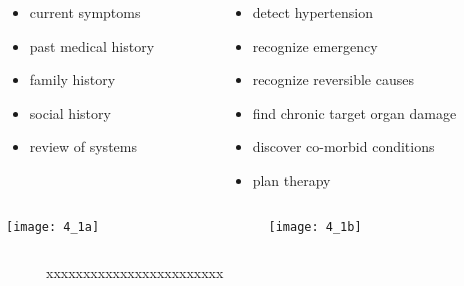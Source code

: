 	
\begin{columns}
  \begin{column}{0.5\textwidth}
    \begin{itemize}
        \item current symptoms
        \item past medical history
        \item family history
        \item social history
        \item review of systems
    \end{itemize}
  \end{column}

  \begin{column}{0.5\textwidth}
     \begin{itemize}
        \item detect hypertension
        \item recognize emergency
        \item recognize reversible causes
        \item find chronic target organ damage
        \item discover co-morbid conditions
        \item plan therapy
     \end{itemize}
  \end{column}
\end{columns}


  \begin{columns}
	\begin{column}{0.5\textwidth}
	  \centering	
  	  \texttt{[image: 4\_1a]}
     \end{column}
  	\begin{column}{0.5\textwidth}
  		\centering	
	    \texttt{[image: 4\_1b]}
       \end{column}
    \end{columns}
 \begin{figure}[h!]
  \centering
    \caption{
    	{\small \NUMfigures 
    	xxxxxxxxxxxxxxxxxxxxxxxx
    }
     }
    \label{fig-4_1}
\end{figure}
